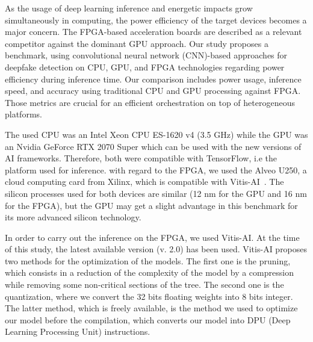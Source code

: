 \begin{table}[t]
\caption{Execution platform characterization}
\begin{center}
\end{center}
\label{table:herofake-platforms}
\end{table}

As the usage of deep learning inference and energetic impacts grow simultaneously in computing, the power efficiency of the target devices becomes a major concern. The FPGA-based acceleration boards are described as a relevant competitor against the dominant GPU approach. Our study proposes a benchmark, using convolutional neural network (CNN)-based approaches for deepfake detection on CPU, GPU, and FPGA technologies regarding power efficiency during inference time. Our comparison includes power usage, inference speed, and accuracy using traditional CPU and GPU processing against FPGA. Those metrics are crucial for an efficient orchestration on top of heterogeneous platforms.

The used CPU was an Intel Xeon CPU ES-1620 v4 (3.5 GHz) while the GPU was an Nvidia GeForce RTX 2070 Super which can be used with the new versions of AI frameworks. Therefore, both were compatible with TensorFlow, i.e the platform used for inference. with regard to the FPGA, we used the Alveo U250, a cloud computing card from Xilinx, which is compatible with Vitis-AI~\cite{vitis-ai}. The silicon processes used for both devices are similar (12 nm for the GPU and 16 nm for the FPGA), but the GPU may get a slight advantage in this benchmark for its more advanced silicon technology.

In order to carry out the inference on the FPGA, we used Vitis-AI. At the time of this study, the latest available version (v. 2.0) has been used. Vitis-AI proposes two methods for the optimization of the models. The first one is the pruning, which consists in a reduction of the complexity of the model by a compression while removing some non-critical sections of the tree. The second one is the quantization, where we convert the 32 bits floating weights into 8 bits integer. The latter method, which is freely available, is the method we used to optimize our model before the compilation, which converts our model into DPU (Deep Learning Processing Unit) instructions.

